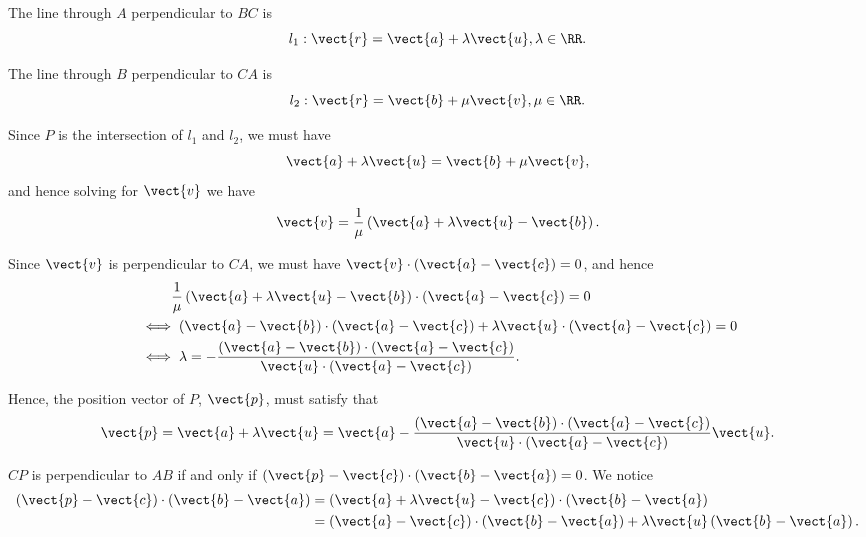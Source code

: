 \Question{\currfilebase}

The line through \(A\) perpendicular to \(BC\) is
\[
    l_1: \vect{r} = \vect{a} + \lambda \vect{u}, \lambda \in \RR.
\]

The line through \(B\) perpendicular to \(CA\) is
\[
    l_2: \vect{r} = \vect{b} + \mu \vect{v}, \mu \in \RR.
\]

Since \(P\) is the intersection of \(l_1\) and \(l_2\), we must have
\[
    \vect{a} + \lambda \vect{u} = \vect{b} + \mu \vect{v},
\]
and hence solving for \(\vect{v}\) we have
\[
    \vect{v} = \frac{1}{\mu} \left(\vect{a} + \lambda \vect{u} - \vect{b}\right).
\]

Since \(\vect{v}\) is perpendicular to \(CA\), we must have \(\vect{v} \cdot (\vect{a} - \vect{c}) = 0\), and hence
\begin{align*}
     & \phantom{\iff} \frac{1}{\mu} \left(\vect{a} + \lambda \vect{u} - \vect{b}\right) \cdot (\vect{a} - \vect{c}) = 0 \\
     & \iff (\vect{a} - \vect{b}) \cdot (\vect{a} - \vect{c}) + \lambda \vect{u} \cdot (\vect{a} - \vect{c}) = 0        \\
     & \iff \lambda = -\frac{(\vect{a} - \vect{b}) \cdot (\vect{a} - \vect{c})}{\vect{u} \cdot (\vect{a} - \vect{c})}.
\end{align*}

Hence, the position vector of \(P\), \(\vect{p}\), must satisfy that
\[
    \vect{p} = \vect{a} + \lambda \vect{u} = \vect{a} - \frac{(\vect{a} - \vect{b}) \cdot (\vect{a} - \vect{c})}{\vect{u} \cdot (\vect{a} - \vect{c})} \vect{u}.
\]

\(CP\) is perpendicular to \(AB\) if and only if \((\vect{p} - \vect{c}) \cdot (\vect{b} - \vect{a}) = 0\). We notice
\begin{align*}
    (\vect{p} - \vect{c}) \cdot (\vect{b} - \vect{a}) & = \left(\vect{a} + \lambda \vect{u} - \vect{c}\right) \cdot (\vect{b} - \vect{a})                                   \\
                                                      & = \left(\vect{a} - \vect{c}\right) \cdot (\vect{b} - \vect{a}) + \lambda \vect{u} \left(\vect{b} - \vect{a}\right).
\end{align*}

